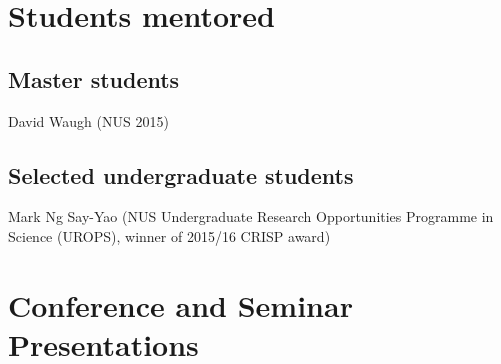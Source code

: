 \section*{Students mentored }

\subsection*{Master students }

David Waugh (NUS 2015)

\subsection*{Selected undergraduate students }

Mark Ng Say-Yao (NUS Undergraduate Research Opportunities Programme in Science (UROPS), winner of 2015/16 CRISP award)

\section*{Conference and Seminar Presentations }

